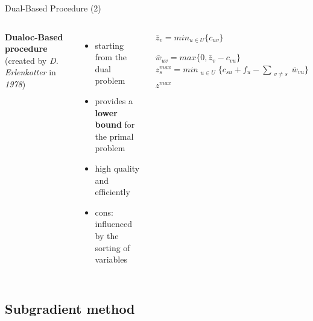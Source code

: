 \documentclass{beamer}
\begin{document}
	    \begin{frame}{Dual-Based Procedure (2)}
	   
	   \begin{columns}
	      
	      
	      \textbf{Dualoc-Based procedure} (created by \textit{D. Erlenkotter} in \textit{1978})
	      \begin{itemize}
	          \item starting from the dual problem
	          \item provides a \textbf{lower bound} for the primal problem
	          \item high quality and efficiently
	          \item cons: influenced by the sorting of variables
	      \end{itemize}
	      
	            \begin{algorithm}[H]
                \begin{algorithmic}[1]
    
                \STATE $\bar{z}_{v} = min_{u \in U}\{c_{uv}\}$
                \ENDFOR
                
                
                \STATE $\bar{w}_{uv} = max\{0, \bar{z}_{v} - c_{vu}\}$
	            \STATE $z^{max}_{s} = min_{\substack{u \in U}} \{{c_{su} + f_{u}} - \sum_{\substack{v \neq s}} \bar{w}_{vu}\}$
                \ENDFOR
                \RETURN $z^{max}$
                
                \end{algorithmic}
                \caption{}
                \end{algorithm}
	           
	           \end{columns}
	    \end{frame}
	    
	    \subsection{Subgradient method}
	    
\end{document}
